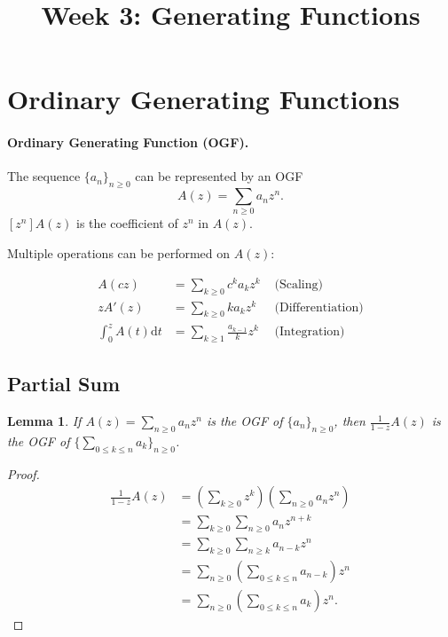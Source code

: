 \documentclass{article}
\newtheorem{lemma}{Lemma}
\begin{document}
\title{Week 3: Generating Functions}
\maketitle

\section{Ordinary Generating Functions}

\paragraph{Ordinary Generating Function (OGF).} The sequence $\{a_n\}_{n \geq
0}$ can be represented by an OGF \begin{equation*}
  A(z) = \sum_{n \geq 0}a_nz^n.
\end{equation*} $[z^n]A(z)$ is the coefficient of $z^n$ in $A(z)$.

Multiple operations can be performed on $A(z)$:

\begin{align*}
  A(cz) &= \sum_{k \geq 0}c^ka_kz^k &\text{ (Scaling)} \\
  zA'(z) &= \sum_{k \geq 0}ka_kz^k &\text{ (Differentiation)} \\
  \int^z_0 A(t) \mathrm{d}t &= \sum_{k \geq 1}\frac{a_{k-1}}{k}z^k
    &\text{ (Integration)}
\end{align*}

\subsection{Partial Sum}

\begin{lemma}
  If $A(z) = \sum_{n \geq 0}a_nz^n$ is the OGF of $\{a_n\}_{n \geq 0}$, then
  $\frac{1}{1 - z}A(z)$ is the OGF of $\{\sum_{0 \leq k \leq n} a_k\}_{n \geq
  0}$.
\end{lemma}

\begin{proof}
  \begin{align*}
    \frac{1}{1 - z}A(z) &= \left(\sum_{k \geq 0} z^k\right) \left(\sum_{n \geq
      0} a_nz^n\right) \\
      &= \sum_{k \geq 0} \sum_{n \geq 0} a_nz^{n + k} \\
      &= \sum_{k \geq 0} \sum_{n \geq k} a_{n - k}z^n \\
      &= \sum_{n \geq 0} \left(\sum_{0 \leq k \leq n} a_{n - k}\right) z^n \\
      &= \sum_{n \geq 0} \left(\sum_{0 \leq k \leq n} a_k\right) z^n.
  \end{align*}
\end{proof}
\end{document}
